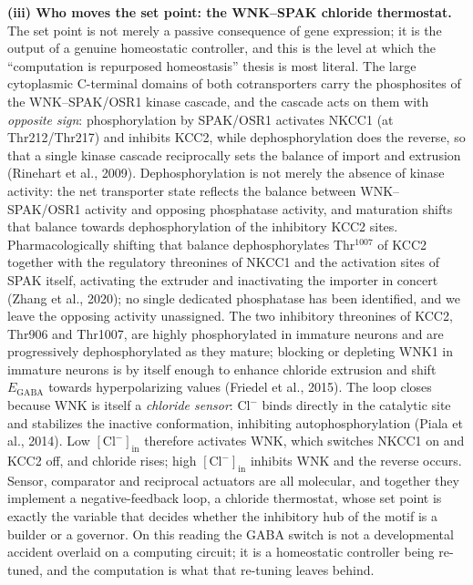 \documentclass[11pt,a4paper]{article}
\newcommand{\Clm}{\mathrm{Cl}^{-}}
\begin{document}
\textbf{(iii) Who moves the set point: the WNK--SPAK chloride thermostat.} The set point is not merely a passive consequence of gene expression; it is the output of a genuine homeostatic controller, and this is the level at which the ``computation is repurposed homeostasis'' thesis is most literal. The large cytoplasmic C-terminal domains of both cotransporters carry the phosphosites of the WNK--SPAK/OSR1 kinase cascade, and the cascade acts on them with \emph{opposite sign}: phosphorylation by SPAK/OSR1 activates NKCC1 (at Thr212/Thr217) and inhibits KCC2, while dephosphorylation does the reverse, so that a single kinase cascade reciprocally sets the balance of import and extrusion (Rinehart et al., 2009). Dephosphorylation is not merely the absence of kinase activity: the net transporter state reflects the balance between WNK--SPAK/OSR1 activity and opposing phosphatase activity, and maturation shifts that balance towards dephosphorylation of the inhibitory KCC2 sites. Pharmacologically shifting that balance dephosphorylates Thr$^{1007}$ of KCC2 together with the regulatory threonines of NKCC1 and the activation sites of SPAK itself, activating the extruder and inactivating the importer in concert (Zhang et al., 2020); no single dedicated phosphatase has been identified, and we leave the opposing activity unassigned. The two inhibitory threonines of KCC2, Thr906 and Thr1007, are highly phosphorylated in immature neurons and are progressively dephosphorylated as they mature; blocking or depleting WNK1 in immature neurons is by itself enough to enhance chloride extrusion and shift $E_{\mathrm{GABA}}$ towards hyperpolarizing values (Friedel et al., 2015). The loop closes because WNK is itself a \emph{chloride sensor}: $\Clm$ binds directly in the catalytic site and stabilizes the inactive conformation, inhibiting autophosphorylation (Piala et al., 2014). Low $[\Clm]_{\mathrm{in}}$ therefore activates WNK, which switches NKCC1 on and KCC2 off, and chloride rises; high $[\Clm]_{\mathrm{in}}$ inhibits WNK and the reverse occurs. Sensor, comparator and reciprocal actuators are all molecular, and together they implement a negative-feedback loop, a chloride thermostat, whose set point is exactly the variable that decides whether the inhibitory hub of the motif is a builder or a governor. On this reading the GABA switch is not a developmental accident overlaid on a computing circuit; it is a homeostatic controller being re-tuned, and the computation is what that re-tuning leaves behind.
\end{document}
